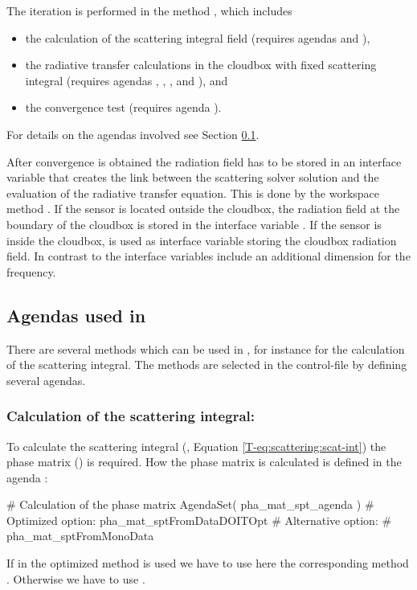 The iteration is performed in the method
, which includes
\begin{itemize}
\item the calculation of the scattering integral field
 (requires agendas 
and ),
\item the radiative transfer calculations in the cloudbox with fixed scattering
integral (requires agendas ,
, , and
), and
\item the convergence test (requires agenda
).
\end{itemize}
For details on the agendas involved see Section
\ref{sec:scattering:doit_iterate_agendas}.

After convergence is obtained the radiation field has to be stored in an
interface variable that creates the link between the scattering solver solution
and the evaluation of the radiative transfer equation. This is done by the
workspace method . If the sensor is located
outside the cloudbox, the radiation field at the boundary of the cloudbox is
stored in the interface variable . If the sensor is inside
the cloudbox,  is used as interface
variable storing the cloudbox radiation field. In contrast to
 the interface variables include an additional
dimension for the frequency.

\subsection{Agendas used in }
\label{sec:scattering:doit_iterate_agendas}
There are several methods which can be used in
, for instance for the calculation of
the scattering integral. The methods are selected in the control-file by
defining several agendas.

\subsubsection{Calculation of the scattering integral:}

To calculate the scattering integral (\theory, Equation \ref{T-eq:scattering:scat-int})
the phase matrix () is required. How 
the phase matrix is calculated is defined in the agenda
:
\begin{code}
# Calculation of the phase matrix
AgendaSet( pha_mat_spt_agenda ){
 # Optimized option:
   pha_mat_sptFromDataDOITOpt
 # Alternative option:
 #  pha_mat_sptFromMonoData
}
\end{code}
If in 
the optimized method  is used we
have to use here the corresponding method
. Otherwise we have to use
.

